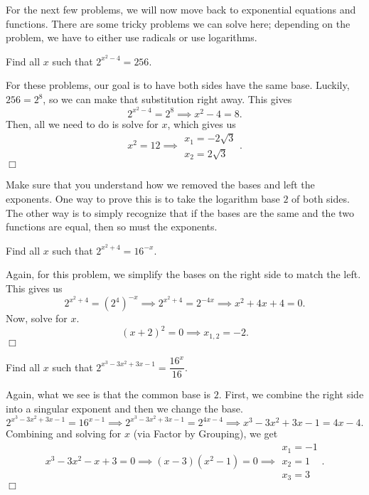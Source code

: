\documentclass[../book.tex]{subfiles}
\begin{document}
For the next few problems, we will now move back to exponential equations and functions.  There are some tricky problems we can solve here; depending on the problem, we have to either use radicals or use logarithms.
\begin{example}
Find all $x$ such that $2^{x^2-4}=256$.
\end{example}
\begin{solution}
For these problems, our goal is to have both sides have the same base.  Luckily, $256=2^8$, so we can make that substitution right away.  This gives $$2^{x^2-4}=2^8 \implies x^2-4=8.$$  Then, all we need to do is solve for $x$, which gives us $$x^2=12 \implies \begin{matrix} x_1=-2\sqrt{3} \\ x_2=2\sqrt{3} \end{matrix}.$$ $\Box$
\end{solution}
\begin{remark}
Make sure that you understand how we removed the bases and left the exponents.  One way to prove this is to take the logarithm base $2$ of both sides.  The other way is to simply recognize that if the bases are the same and the two functions are equal, then so must the exponents.
\end{remark}
\begin{example}
Find all $x$ such that $2^{x^2+4}=16^{-x}$.
\end{example}
\begin{solution}
Again, for this problem, we simplify the bases on the right side to match the left.  This gives us $$2^{x^2+4}=\left(2^4\right)^{-x} \implies 2^{x^2+4}=2^{-4x} \implies x^2+4x+4=0.$$  Now, solve for $x$.  $$(x+2)^2=0 \implies x_{1,2}=-2.$$ $\Box$
\end{solution}
\begin{example}
Find all $x$ such that $2^{x^3-3x^2+3x-1}=\dfrac{16^x}{16}$.
\end{example}
\begin{solution}
Again, what we see is that the common base is $2$.  First, we combine the right side into a singular exponent and then we change the base.  $$2^{x^3-3x^2+3x-1}=16^{x-1} \implies 2^{x^3-3x^2+3x-1}=2^{4x-4} \implies x^3-3x^2+3x-1=4x-4.$$ Combining and solving for $x$ (via Factor by Grouping), we get $$x^3-3x^2-x+3=0 \implies (x-3)(x^2-1)=0 \implies \begin{matrix} x_1=-1 \\ x_2=1 \\ x_3=3 \end{matrix}.$$ $\Box$
\end{solution}
\end{document}
